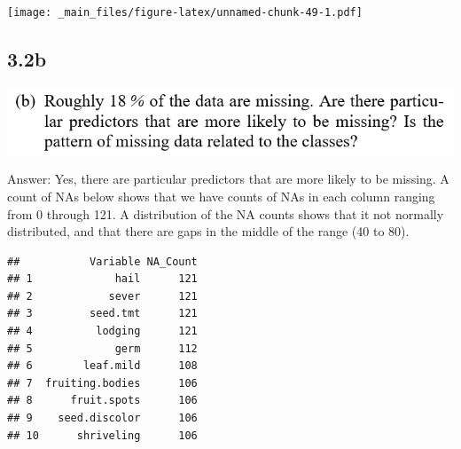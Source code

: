 \documentclass[]{book}
\newenvironment{Shaded}{\begin{snugshade}}{\end{snugshade}}
\newcommand{\CommentTok}[1]{\textcolor[rgb]{0.56,0.35,0.01}{\textit{#1}}}
\newcommand{\ControlFlowTok}[1]{\textcolor[rgb]{0.13,0.29,0.53}{\textbf{#1}}}
\newcommand{\DataTypeTok}[1]{\textcolor[rgb]{0.13,0.29,0.53}{#1}}
\newcommand{\DecValTok}[1]{\textcolor[rgb]{0.00,0.00,0.81}{#1}}
\newcommand{\KeywordTok}[1]{\textcolor[rgb]{0.13,0.29,0.53}{\textbf{#1}}}
\newcommand{\NormalTok}[1]{#1}
\newcommand{\OperatorTok}[1]{\textcolor[rgb]{0.81,0.36,0.00}{\textbf{#1}}}
\newcommand{\OtherTok}[1]{\textcolor[rgb]{0.56,0.35,0.01}{#1}}
\newcommand{\StringTok}[1]{\textcolor[rgb]{0.31,0.60,0.02}{#1}}
\begin{document}
\texttt{[image: \_main\_files/figure-latex/unnamed-chunk-49-1.pdf]}

\hypertarget{b-5}{%
\subsection{3.2b}\label{b-5}}

\includegraphics{./week3/3.2b.png}

Answer:
Yes, there are particular predictors that are more likely to be missing. A count of NAs below shows that we have counts of NAs in each column ranging from 0 through 121. A distribution of the NA counts shows that it not normally distributed, and that there are gaps in the middle of the range (40 to 80).

\begin{Shaded}
\end{Shaded}

\begin{verbatim}
##           Variable NA_Count
## 1             hail      121
## 2            sever      121
## 3         seed.tmt      121
## 4          lodging      121
## 5             germ      112
## 6        leaf.mild      108
## 7  fruiting.bodies      106
## 8      fruit.spots      106
## 9    seed.discolor      106
## 10      shriveling      106
\end{verbatim}
\end{document}
